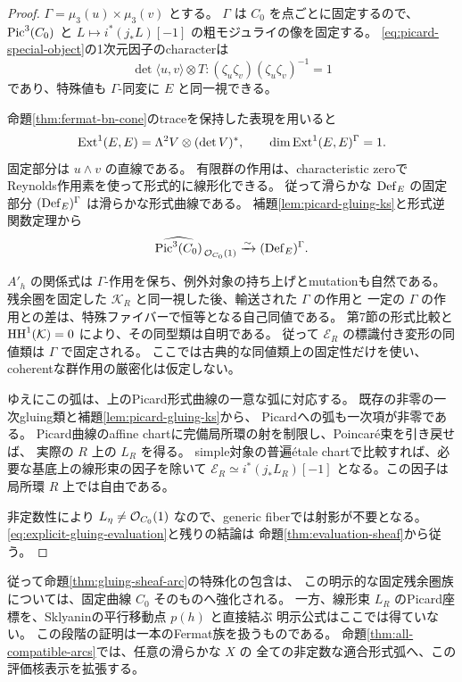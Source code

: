 \begin{proof}
$\Gamma=\mu_3(u)\times\mu_3(v)$ とする。
$\Gamma$ は $C_0$ を点ごとに固定するので、$\operatorname{Pic}^3(C_0)$ と
$L\mapsto i^*(j_*L)[-1]$ の粗モジュライの像を固定する。
\eqref{eq:picard-special-object}の1次元因子のcharacterは
\[
 \det\langle u,v\rangle\otimes T:
 (\zeta_u\zeta_v)(\zeta_u\zeta_v)^{-1}=1
\]
であり、特殊値も $\Gamma$-同変に $E$ と同一視できる。

命題\ref{thm:fermat-bn-cone}のtraceを保持した表現を用いると
\[
 \operatorname{Ext}^1(E,E)=\Lambda^2V\otimes(\det V)^*,\qquad
 \dim\operatorname{Ext}^1(E,E)^\Gamma=1.
\]
固定部分は $u\wedge v$ の直線である。
有限群の作用は、characteristic zeroでReynolds作用素を使って形式的に線形化できる。
従って滑らかな $\operatorname{Def}_E$ の固定部分 $(\operatorname{Def}_E)^\Gamma$ は滑らかな形式曲線である。
補題\ref{lem:picard-gluing-ks}と形式逆関数定理から
\[
 \widehat{\operatorname{Pic}^3(C_0)}_{\,\mathcal O_{C_0}(1)}
       \xrightarrow{\sim}(\operatorname{Def}_E)^\Gamma.
\]

$A'_h$ の関係式は $\Gamma$-作用を保ち、例外対象の持ち上げとmutationも自然である。
残余圏を固定した $\mathcal K_R$ と同一視した後、輸送された $\Gamma$ の作用と
一定の $\Gamma$ の作用との差は、特殊ファイバーで恒等となる自己同値である。
第7節の形式比較と $\operatorname{HH}^1(\mathcal K)=0$ により、その同型類は自明である。
従って $\mathcal E_R$ の標識付き変形の同値類は $\Gamma$ で固定される。
ここでは古典的な同値類上の固定性だけを使い、coherentな群作用の厳密化は仮定しない。

ゆえにこの弧は、上のPicard形式曲線の一意な弧に対応する。
既存の非零の一次gluing類と補題\ref{lem:picard-gluing-ks}から、
Picardへの弧も一次項が非零である。
Picard曲線のaffine chartに完備局所環の射を制限し、Poincar\'e束を引き戻せば、
実際の $R$ 上の $L_R$ を得る。
simple対象の普遍\'etale chartで比較すれば、必要な基底上の線形束の因子を除いて
$\mathcal E_R\simeq i^*(j_*L_R)[-1]$ となる。この因子は局所環 $R$ 上では自由である。

非定数性により $L_\eta\ne\mathcal O_{C_0}(1)$ なので、generic fiberでは射影が不要となる。
\eqref{eq:explicit-gluing-evaluation}と残りの結論は
命題\ref{thm:evaluation-sheaf}から従う。
\end{proof}

従って命題\ref{thm:gluing-sheaf-arc}の特殊化の包含は、
この明示的な固定残余圏族については、固定曲線 $C_0$ そのものへ強化される。
一方、線形束 $L_R$ のPicard座標を、Sklyaninの平行移動点 $p(h)$ と直接結ぶ
明示公式はここでは得ていない。
この段階の証明は一本のFermat族を扱うものである。
命題\ref{thm:all-compatible-arcs}では、任意の滑らかな $X$ の
全ての非定数な適合形式弧へ、この評価核表示を拡張する。

